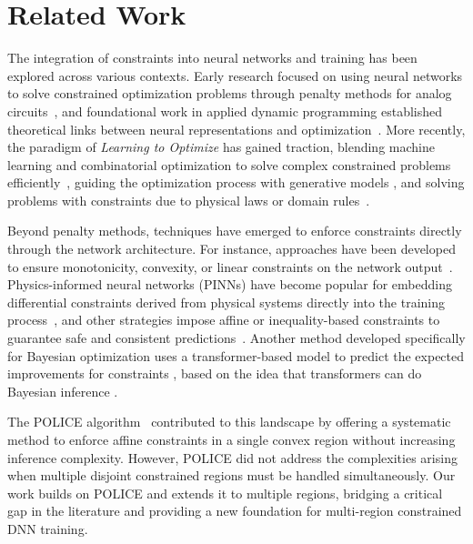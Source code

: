 \section{Related Work}
The integration of constraints into neural networks and training has been explored across various contexts. Early research focused on using neural networks to solve constrained optimization problems through penalty methods for analog circuits~\citep{286888,995659}, and foundational work in applied dynamic programming established theoretical links between neural representations and optimization~\citep{bellman2015applied}. More recently, the paradigm of \emph{Learning to Optimize} has gained traction, blending machine learning and combinatorial optimization to solve complex constrained problems efficiently~\citep{kotary2021end,kotary2024learning}, guiding the optimization process with generative models \cite{giannone2023aligning, picard2024generative}, and solving problems with constraints due to physical laws or domain rules~\citep{PhysRevLett.126.098302,doi:10.1137/21M1397908,XIE2024117223,pmlr-v168-djeumou22a}.

Beyond penalty methods, techniques have emerged to enforce constraints directly through the network architecture. For instance, approaches have been developed to ensure monotonicity, convexity, or linear constraints on the network output~\citep{Li_2018_ECCV,tordesillas2023rayen,konstantinov2024imposing,zhong2023neural}. Physics-informed neural networks (PINNs) have become popular for embedding differential constraints derived from physical systems directly into the training process~\citep{NEURIPS2021_df438e52,NEURIPS2021_d5ade38a}, and other strategies impose affine or inequality-based constraints to guarantee safe and consistent predictions~\citep{kondo2024cgd,bouvier2024policed,bouvier2024learning}. Another method developed specifically for Bayesian optimization uses a transformer-based model to predict the expected improvements for constraints \cite{yu2024fast}, based on the idea that transformers can do Bayesian inference \cite{muller2021transformers}.

The POLICE algorithm~\citep{police} contributed to this landscape by offering a systematic method to enforce affine constraints in a single convex region without increasing inference complexity. However, POLICE did not address the complexities arising when multiple disjoint constrained regions must be handled simultaneously. Our work builds on POLICE and extends it to multiple regions, bridging a critical gap in the literature and providing a new foundation for multi-region constrained DNN training.